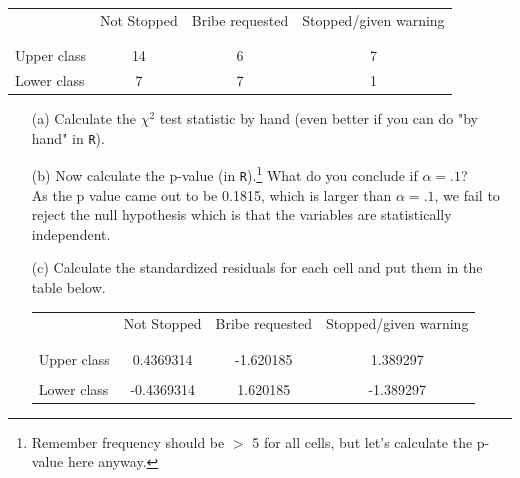 \documentclass[12pt,letterpaper]{article}
\begin{document}
\newpage
\begin{table}[h!]
	\centering
	\begin{tabular}{l | c c c }
		& Not Stopped & Bribe requested & Stopped/given warning \\
		\\[-1.8ex] 
		\hline \\[-1.8ex]
		Upper class & 14 & 6 & 7 \\
		Lower class & 7 & 7 & 1 \\
		\hline
	\end{tabular}
\end{table}

\begin{enumerate}
	
	\item [(a)]
	Calculate the $\chi^2$ test statistic by hand (even better if you can do "by hand" in \texttt{R}).\\

	
	
	
	\item [(b)]
	Now calculate the p-value (in \texttt{R}).\footnote{Remember frequency should be $>$ 5 for all cells, but let's calculate the p-value here anyway.}  What do you conclude if $\alpha = .1$?\\
	
	
	
	As the p value came out to be 0.1815, which is larger than $\alpha = .1$, we fail to reject the null hypothesis which is that the variables are statistically independent. 
	
	\newpage
	\item [(c)] Calculate the standardized residuals for each cell and put them in the table below.
	\vspace{1cm}
	
	\begin{table}[h]
		\centering
		\begin{tabular}{l | c c c }
			& Not Stopped & Bribe requested & Stopped/given warning \\
			\\[-1.8ex] 
			\hline \\[-1.8ex]
			Upper class  & 0.4369314 & -1.620185 & 1.389297 \\
			\\
			Lower class & -0.4369314 & 1.620185  & -1.389297\\
			

\end{tabular}
\end{table}
\end{enumerate}
\end{document}
